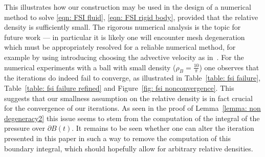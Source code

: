 \documentclass[a4paper]{amsart}
\numberwithin{equation}{section}
\theoremstyle{plain}
\begin{document}
This illustrates how our construction may be used in the design of a numerical method to solve \eqref{eqn: FSI fluid}, \eqref{eqn: FSI rigid body}, provided that the relative density is sufficiently small.
The rigorous numerical analysis is the topic for future work --- in particular it is likely one will encounter mesh degeneration which must be appropriately resolved for a reliable numerical method, for example by using introducing choosing the advective velocity as in~\cite{Elliott2016DeTurck}.
For the numerical experiments with a ball with small density ($\rho_B = \frac{10}{\pi}$) one observes that the iterations do indeed fail to converge, as illustrated in Table~\ref{table: fsi failure}, Table~\ref{table: fsi failure refined} and Figure~\ref{fig: fsi nonconvergence}.
This suggests that our smallness assumption on the relative density is in fact crucial for the convergence of our iterations.
As seen in the proof of Lemma~\ref{lemma: non degeneracy2} this issue seems to stem from the computation of the integral of the pressure over $\partial B(t)$.
It remains to be seen whether one can alter the iteration presented in this paper in such a way to remove the computation of this boundary integral, which should hopefully allow for arbitrary relative densities.
\end{document}
